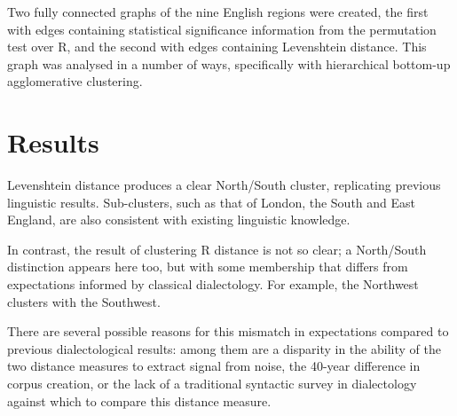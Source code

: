 \documentclass[11pt]{article}
\begin{document}
Two fully connected graphs of the nine English regions were created,
the first with edges containing statistical significance information
from the permutation test over R, and the second with edges containing
Levenshtein distance. This graph was analysed in a number of ways,
specifically with hierarchical bottom-up agglomerative clustering.

\section{Results}
Levenshtein distance produces a clear North/South cluster, replicating
previous linguistic results. Sub-clusters, such as that of London, the
South and East England, are also consistent with existing linguistic
knowledge.

In contrast, the result of clustering R distance is not so clear; a
North/South distinction appears here too, but with some membership
that differs from expectations informed by classical dialectology. For
example, the Northwest clusters with the Southwest.

There are several possible reasons for this mismatch in expectations
compared to previous dialectological results: among them are a
disparity in the ability of the two distance measures to extract
signal from noise, the 40-year difference in corpus creation, or the lack of a
traditional syntactic survey in dialectology against which to compare
this distance measure.



\end{document}
